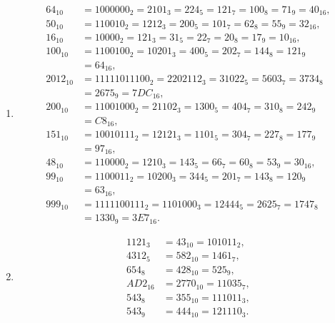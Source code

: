 \begin{enumerate}
\begin{enumerate}
\item
\begin{align*}
64_{10} &= 100 0000_2 = 2101_3 = 224_5 = 121_7 = 100_8 = 71_9 = 40_{16}, \\
50_{10} &= 11 0010_2 = 1212_3 = 200_5 = 101_7 = 62_8 = 55_9 = 32_{16}, \\
16_{10} &= 1 0000_2 = 121_3 = 31_5 = 22_7 = 20_8 = 17_9 = 10_{16}, \\
100_{10} &= 110 0100_2 = 1 0201_3 = 400_5 = 202_7 = 144_8 = 121_9 \\
&= 64_{16}, \\
2012_{10} &= 111 1101 1100_2 = 220 2112_3 = 3 1022_5 = 5603_7 = 3734_8 \\
&= 2675_9 = 7DC_{16}, \\
200_{10} &= 1100 1000_2 = 2 1102_3 = 1300_5 = 404_7 = 310_8 = 242_9 \\
&= C8_{16}, \\
151_{10} &= 1001 0111_2 = 1 2121_3 = 1101_5 = 304_7 = 227_8 = 177_9 \\
&= 97_{16}, \\
48_{10} &= 11 0000_2 = 1210_3 = 143_5 = 66_7 = 60_8 = 53_9 = 30_{16}, \\
99_{10} &= 110 0011_2 = 1 0200_3 = 344_5 = 201_7 = 143_8 = 120_9 \\
&= 63_{16}, \\
999_{10} &= 11 1110 0111_2 = 110 1000_3 = 1 2444_5 = 2625_7 = 1747_8 \\
&= 1330_9 = 3E7_{16}. 
\end{align*}

\item
\begin{align*}
1121_3 &= 43_{10} = 101011_2, \\
4312_5 &= 582_{10} = 1461_7, \\
654_8 &= 428_{10} = 525_9, \\
AD2_{16} &= 2770_{10} = 11035_7, \\
543_8 &= 355_{10} = 111011_3, \\
543_9 &= 444_{10} = 121110_3. 
\end{align*}


\end{enumerate}
\end{enumerate}
